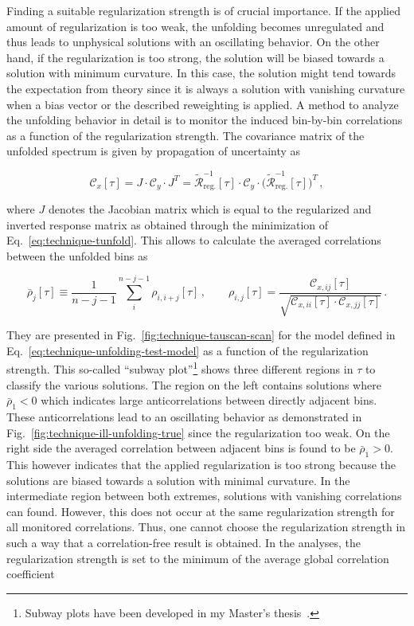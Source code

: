 Finding a suitable regularization strength is of crucial importance. If the applied amount of regularization is too weak, the unfolding becomes unregulated and thus leads to unphysical solutions with an oscillating behavior. On the other hand, if the regularization is too strong, the solution will be biased towards a solution with minimum curvature. In this case, the solution might tend towards the expectation from theory since it is always a solution with vanishing curvature when a bias vector or the described reweighting is applied. A method to analyze the unfolding behavior in detail is to monitor the induced bin-by-bin correlations as a function of the regularization strength. The covariance matrix of the unfolded spectrum is given by propagation of uncertainty as

\begin{equation}
\mathcal{C}_{x}[\tau]=J\cdot\mathcal{C}_{y}\cdot J^{T}=\tilde{\mathcal{R}}^{-1}_\mathrm{reg.}[\tau]\cdot\mathcal{C}_{y}\cdot\big(\tilde{\mathcal{R}}^{-1}_\mathrm{reg.}[\tau]\big)^{T}\,,
\end{equation}

where $J$ denotes the Jacobian matrix which is equal to the regularized and inverted response matrix as obtained through the minimization of Eq.~\ref{eq:technique-tunfold}. This allows to calculate the averaged correlations between the unfolded bins as

\begin{equation}
\bar{\rho}_{j}[\tau]\equiv\frac{1}{n-j-1}\sum_{i}^{n-j-1}\rho_{i,i+j}[\tau]\,,\qquad \rho_{i,j}[\tau]=\frac{\mathcal{C}_{x,ij}[\tau]}{\sqrt{\mathcal{C}_{x,ii}[\tau]\cdot\mathcal{C}_{x,jj}[\tau]}}\,.\label{eq:technique-avg-correlation}
\end{equation}

They are presented in Fig.~\ref{fig:technique-tauscan-scan} for the model defined in Eq.~\ref{eq:technique-unfolding-test-model} as a function of the regularization strength. This so-called ``subway plot''\footnote{Subway plots have been developed in my Master's thesis~\cite{Komm-thesis}.} shows three different regions in $\tau$ to classify the various solutions. The region on the left contains solutions where $\bar{\rho}_{1}<0$ which indicates large anticorrelations between directly adjacent bins. These anticorrelations lead to an oscillating behavior as demonstrated in Fig.~\ref{fig:technique-ill-unfolding-true} since the regularization too weak. On the right side the averaged correlation between adjacent bins is found to be $\bar{\rho}_{1}>0$. This however indicates that the applied regularization is too strong because the solutions are biased towards a solution with minimal curvature. In the intermediate region between both extremes, solutions with vanishing correlations can found. However, this does not occur at the same regularization strength for all monitored correlations. Thus, one cannot choose the regularization strength in such a way that a correlation-free result is obtained. In the analyses, the regularization strength is set to the minimum of the average global correlation coefficient

